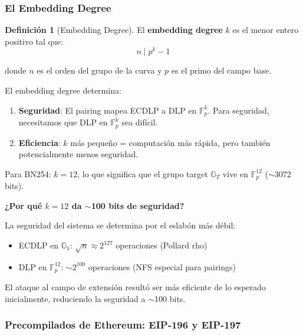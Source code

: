 \documentclass[11pt,a4paper,twoside,openright]{book}
\theoremstyle{definition}
\newtheorem{definition}{Definición}[chapter]
\theoremstyle{plain}
\theoremstyle{remark}
\newcommand{\Fp}{\mathbb{F}_p}
\newcommand{\G}{\mathbb{G}}
\begin{document}
\subsubsection{El Embedding Degree}

\begin{definition}[Embedding Degree]
El \textbf{embedding degree} $k$ es el menor entero positivo tal que:
\[ n \mid p^k - 1 \]

donde $n$ es el orden del grupo de la curva y $p$ es el primo del campo base.
\end{definition}

\begin{keyidea}
El embedding degree determina:
\begin{enumerate}
    \item \textbf{Seguridad}: El pairing mapea ECDLP a DLP en $\Fp^k$. Para seguridad, necesitamos que DLP en $\Fp^k$ sea difícil.
    \item \textbf{Eficiencia}: $k$ más pequeño = computación más rápida, pero también potencialmente menos seguridad.
\end{enumerate}

Para BN254: $k = 12$, lo que significa que el grupo target $\G_T$ vive en $\Fp^{12}$ ($\sim$3072 bits).
\end{keyidea}

\begin{mathnote}
\textbf{¿Por qué $k = 12$ da $\sim$100 bits de seguridad?}

La seguridad del sistema se determina por el eslabón más débil:
\begin{itemize}
    \item ECDLP en $\G_1$: $\sqrt{n} \approx 2^{127}$ operaciones (Pollard rho)
    \item DLP en $\Fp^{12}$: $\sim 2^{100}$ operaciones (NFS especial para pairings)
\end{itemize}

El ataque al campo de extensión resultó ser más eficiente de lo esperado inicialmente, reduciendo la seguridad a $\sim$100 bits.
\end{mathnote}

\subsubsection{Precompilados de Ethereum: EIP-196 y EIP-197}
\end{document}
